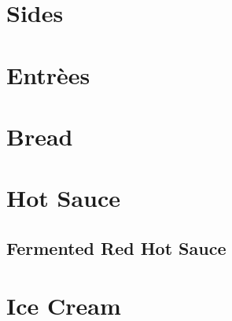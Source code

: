 \chapter{Sides}
\clearpage



\chapter{Entr\`{e}es}
\clearpage







\chapter{Bread}
\clearpage


\chapter{Hot Sauce}
\clearpage
{

	\section[Red Hot Sauce]{Fermented Red Hot Sauce}
	\let\section\subsection
	\let\subsection\subsubsection
	
	
}

\chapter{Ice Cream}
\clearpage




